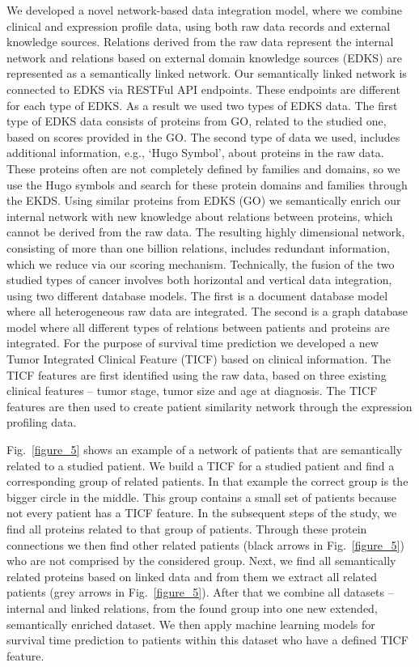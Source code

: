 \documentclass{bmcart}
\begin{document}
We developed a novel network-based data integration model, where we
combine clinical and expression profile data, using both raw data
records and external knowledge sources. Relations derived from the raw
data represent the internal network and relations based on external
domain knowledge sources (EDKS) are represented as a semantically
linked network. Our semantically linked network is connected to EDKS
via RESTFul API endpoints. These endpoints are different for each type
of EDKS. As a result we used two types of EDKS data. The first type of
EDKS data consists of proteins from GO, related to the studied one,
based on scores provided in the GO. The second type of data we used,
includes additional information, e.g., {\textquoteleft}Hugo
Symbol{\textquoteright}, about proteins in the raw data. These proteins
often are not completely defined by families and domains, so we use the
Hugo symbols and search for these protein domains and families through
the EKDS. Using similar proteins from EDKS (GO) we semantically enrich
our internal network with new knowledge about relations between
proteins, which cannot be derived from the raw data. The resulting
highly dimensional network, consisting of more than one billion
relations, includes redundant information, which we reduce via our
scoring mechanism. Technically, the fusion of the two studied types of
cancer involves both horizontal and vertical data integration, using
two different database models. The first is a document database model
where all heterogeneous raw data are integrated. The second is a graph
database model where all different types of relations between patients
and proteins are integrated. For the purpose of survival time
prediction we developed a new Tumor Integrated Clinical Feature (TICF)
based on clinical information. The TICF features are first identified
using the raw data, based on three existing clinical features -- tumor
stage, tumor size and age at diagnosis. The TICF features are then used
to create patient similarity network through the expression profiling
data. 



Fig.~\ref{figure_5} shows an example of a network of patients that are
semantically related to a studied patient. We build a TICF for a
studied patient and find a corresponding group of related patients. In
that example the correct group is the bigger circle in the middle. This
group contains a small set of patients because not every patient has a
TICF feature. In the subsequent steps of the study, we find all
proteins related to that group of patients. Through these protein
connections we then find other related patients (black arrows in Fig.~\ref{figure_5}) who are not comprised by the considered group. Next, we find all
semantically related proteins based on linked data and from them we
extract all related patients (grey arrows in Fig.~\ref{figure_5}). After that we
combine all datasets -- internal and linked relations, from the found
group into one new extended, semantically enriched dataset. We then
apply machine learning models for survival time prediction to patients
within this dataset who have a defined TICF feature.
\end{document}
